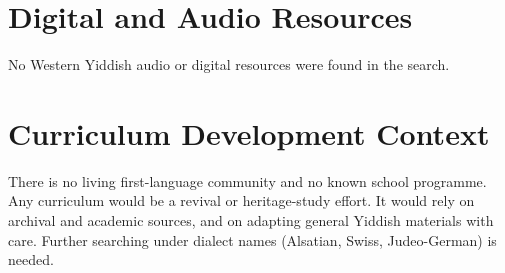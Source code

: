 \documentclass[12pt]{article}
\begin{document}
\section{Digital and Audio Resources}
No Western Yiddish audio or digital resources were found in the search.
\section{Curriculum Development Context}
There is no living first-language community and no known school programme. Any curriculum would be a revival or heritage-study effort. It would rely on archival and academic sources, and on adapting general Yiddish materials with care. Further searching under dialect names (Alsatian, Swiss, Judeo-German) is needed.
\end{document}
